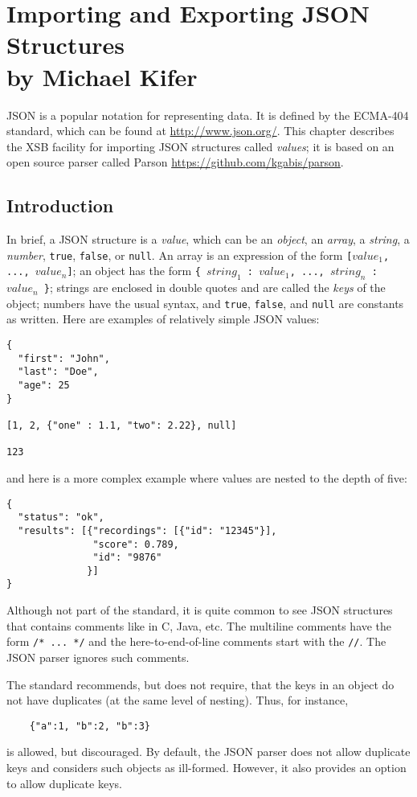 \chapter[Importing JSON Structures]
{Importing and Exporting JSON Structures\\
  {\Large by Michael Kifer}}

JSON is a popular notation for representing data. It is defined
by the ECMA-404 standard, which can be found at \url{http://www.json.org/}.
This chapter describes the XSB facility for importing JSON structures
called \emph{values}; it is based on an open source parser called Parson
\url{https://github.com/kgabis/parson}.

\section{Introduction}

In brief, a JSON structure is a \emph{value}, which can be
an \emph{object}, an
\emph{array}, a \emph{string}, a \emph{number},  \texttt{true}, \texttt{false},
or \texttt{null}. An array is an expression of the form
\texttt{[$value_1$, ..., $value_n$]}; an object has the form
\texttt{\{ $string_1$ : $value_1$,  ..., $string_n$ : $value_n$
  \}}; strings are enclosed in double quotes and are called the \emph{keys}
of the object; numbers have the usual
syntax, and \texttt{true}, \texttt{false}, and \texttt{null} are constants
as written. Here are examples of relatively simple JSON values:
\begin{verbatim}
{
  "first": "John",
  "last": "Doe",
  "age": 25
}

[1, 2, {"one" : 1.1, "two": 2.22}, null]

123
\end{verbatim}
and here is a more complex example where values are nested to the depth of
five:
\begin{verbatim}
{
  "status": "ok",
  "results": [{"recordings": [{"id": "12345"}],
               "score": 0.789,
               "id": "9876"
              }]
}
\end{verbatim}

Although not part of the standard, it is quite common to see JSON
structures that contains comments like in C, Java, etc. The multiline
comments have the form \texttt{/* ... */} and the here-to-end-of-line
comments start with the \texttt{//}. The JSON parser ignores such comments.

The standard recommends, but does not require, that the keys in an object
do not have duplicates (at the same level of nesting). Thus, for instance,
\begin{verbatim}
    {"a":1, "b":2, "b":3}
\end{verbatim}
is allowed, but discouraged. By default, the JSON parser does not allow
duplicate keys and considers such objects as ill-formed. However, it also
provides an option to allow duplicate keys.


